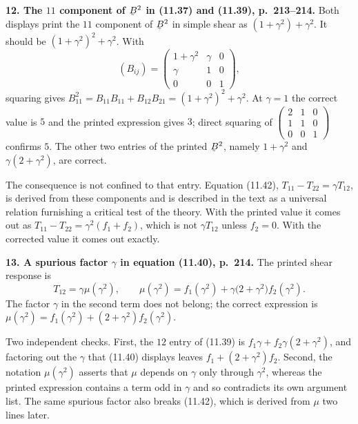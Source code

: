 \documentclass[12pt,a4paper]{article}
\DeclareRobustCommand{\vek}[1]{\underaccent{\tilde}{#1}}
\newcommand{\bB}{\vek{B}}
\newenvironment{query}[1]%
  {\par\medskip\noindent\textbf{#1}\quad}{\par\medskip}
\begin{document}
\begin{query}{12. The $11$ component of $\bB^{2}$ in (11.37) and (11.39),
p.~213--214.}
Both displays print the $11$ component of $\bB^{2}$ in simple shear as
$(1+\gamma^{2})+\gamma^{2}$. It should be
$(1+\gamma^{2})^{2}+\gamma^{2}$. With
\[
   (B_{ij})=\begin{pmatrix}1+\gamma^{2}&\gamma&0\\
   \gamma&1&0\\ 0&0&1\end{pmatrix},
\]
squaring gives
$B^{2}_{11}=B_{11}B_{11}+B_{12}B_{21}=(1+\gamma^{2})^{2}+\gamma^{2}$. At
$\gamma=1$ the correct value is $5$ and the printed expression gives
$3$; direct squaring of
$\left(\begin{smallmatrix}2&1&0\\1&1&0\\0&0&1\end{smallmatrix}\right)$
confirms $5$. The other two entries of the printed $\bB^{2}$, namely
$1+\gamma^{2}$ and $\gamma(2+\gamma^{2})$, are correct.

The consequence is not confined to that entry. Equation (11.42),
$T_{11}-T_{22}=\gamma T_{12}$, is derived from these components and is
described in the text as a universal relation furnishing a critical test
of the theory. With the printed value it comes out as
$T_{11}-T_{22}=\gamma^{2}(f_{1}+f_{2})$, which is not $\gamma T_{12}$
unless $f_{2}=0$. With the corrected value it comes out exactly.
\end{query}

\begin{query}{13. A spurious factor $\gamma$ in equation (11.40),
p.~214.}
The printed shear response is
\[
   T_{12}=\gamma\mu(\gamma^{2}),\qquad
   \mu(\gamma^{2})=f_{1}(\gamma^{2})
   +\gamma\big(2+\gamma^{2}\big)f_{2}(\gamma^{2}).
\]
The factor $\gamma$ in the second term does not belong; the correct
expression is $\mu(\gamma^{2})=f_{1}(\gamma^{2})
+(2+\gamma^{2})f_{2}(\gamma^{2})$.

Two independent checks. First, the $12$ entry of (11.39) is
$f_{1}\gamma+f_{2}\gamma(2+\gamma^{2})$, and factoring out the $\gamma$
that (11.40) displays leaves $f_{1}+(2+\gamma^{2})f_{2}$. Second, the
notation $\mu(\gamma^{2})$ asserts that $\mu$ depends on $\gamma$ only
through $\gamma^{2}$, whereas the printed expression contains a term odd
in $\gamma$ and so contradicts its own argument list. The same spurious
factor also breaks (11.42), which is derived from $\mu$ two lines later.
\end{query}
\end{document}
